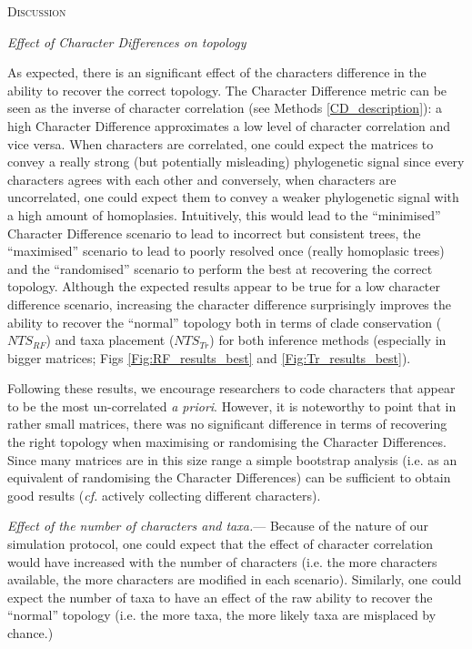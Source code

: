\documentclass[12pt,letterpaper]{article}
\renewcommand{\section}[1]{%
\bigskip
\begin{center}
\begin{Large}
\normalfont\scshape #1
\medskip
\end{Large}
\end{center}}
\renewcommand{\subsection}[1]{%
\bigskip
\begin{center}
\begin{large}
\normalfont\itshape #1
\end{large}
\end{center}}
\renewcommand{\subsubsection}[1]{%
\vspace{2ex}
\noindent
\textit{#1.}---}
\begin{document}
\section{Discussion}

\subsection{Effect of Character Differences on topology}
As expected, there is an significant effect of the characters difference in the ability to recover the correct topology.
The Character Difference metric can be seen as the inverse of character correlation (see Methods \ref{CD_description}): a high Character Difference approximates a low level of character correlation and vice versa.
When characters are correlated, one could expect the matrices to convey a really strong (but potentially misleading) phylogenetic signal since every characters agrees with each other and conversely, when characters are uncorrelated, one could expect them to convey a weaker phylogenetic signal with a high amount of homoplasies.
Intuitively, this would lead to the ``minimised'' Character Difference scenario to lead to incorrect but consistent trees, the ``maximised'' scenario to lead to poorly resolved once (really homoplasic trees) and the ``randomised'' scenario to perform the best at recovering the correct topology.
Although the expected results appear to be true for a low character difference scenario, increasing the character difference surprisingly improves the ability to recover the ``normal'' topology both in terms of clade conservation ($NTS_{RF}$) and taxa placement ($NTS_{Tr}$) for both inference methods (especially in bigger matrices; Figs \ref{Fig:RF_results_best} and \ref{Fig:Tr_results_best}).

Following these results, we encourage researchers to code characters that appear to be the most un-correlated \textit{a priori}.
However, it is noteworthy to point that in rather small matrices, there was no significant difference in terms of recovering the right topology when maximising or randomising the Character Differences.
Since many matrices are in this size range \citep{guillerme2016assessment} a simple bootstrap analysis (i.e. as an equivalent of randomising the Character Differences) can be sufficient to obtain good results (\textit{cf.} actively collecting different characters).

\subsubsection{Effect of the number of characters and taxa}
Because of the nature of our simulation protocol, one could expect that the effect of character correlation would have increased with the number of characters (i.e. the more characters available, the more characters are modified in each scenario).
Similarly, one could expect the number of taxa to have an effect of the raw ability to recover the ``normal'' topology (i.e. the more taxa, the more likely taxa are misplaced by chance.)
\end{document}
